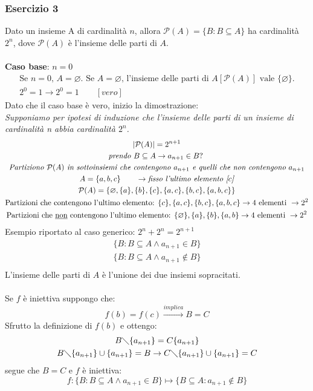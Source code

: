 \documentclass[italian]{article}
\begin{document}
\subsubsection{Esercizio 3}
Dato un insieme A di cardinalità $n$, allora $\mathcal{P}(A)=\{B:B\subseteq A\}$ ha cardinalità $2^n$, dove $\mathcal{P}(A)$ è l'insieme delle parti di $A$.\\\\
\textbf{Caso base}: $n=0$
\begin{gather*}
	\text{Se } n=0 \text{, } A=\varnothing \text{. } \text{Se } A=\varnothing \text{, l'insieme delle parti di } A [\mathcal{P}(A)]\text{ vale } \{\varnothing \}.\\
	2^0 = 1 \to 2^0 = 1 \qquad [vero]
\end{gather*}
Dato che il caso base è vero, inizio la dimostrazione:\\
\textit{Supponiamo per ipotesi di induzione che l'insieme delle parti di un insieme di cardinalità n abbia cardinalità $2^n$.}
\begin{gather*}
	|\mathcal{P}(A)|=2^{n+1} \\
	\textit{prendo } B\subseteq A \to  a_{n+1} \in B?\;\\
	\textit{Partiziono $\mathcal{P}(A)$ in sottoinsiemi che contengono } a_{n+1} \textit{ e quelli che non contengono } a_{n+1}	\\
	A = \{a,b,c\} \qquad \to \textit{fisso l'ultimo elemento [$c$]} \\
	\mathcal{P}(A)=\{\varnothing, \{a\}, \{b\}, \{c\}, \{a, c\}, \{b,c\}, \{a,b,c\}\}\\
	\text{Partizioni che contengono l'ultimo elemento: } 
	\{c\}, \{a,c\}, \{b,c\},\{a,b,c\} \to 4 \text{ elementi } \to 2^2\\
	\text{Partizioni che \underline{non} contengono l'ultimo elemento: } 
	\{\varnothing\}, \{a\}, \{b\},\{a,b\} \to 4 \text{ elementi } \to 2^2
\end{gather*}
Esempio riportato al caso generico: $2^n+2^n = 2^{n+1}$
\begin{gather*}
	\{B:B\subseteq A \land a_{n+1} \in B\} \\
	\{B:B\subseteq A \land a_{n+1} \notin B\} \\
\end{gather*}
L'insieme delle parti di $A$ è l'unione dei due insiemi sopracitati.\\\\
Se $f$ è iniettiva suppongo che:
\[
	f(b) = f(c) \xrightarrow{implica} B=C
\]
Sfrutto la definizione di $f(b)$ e ottengo:
\begin{gather*}
	B \diagdown \{a_{n+1}\} = C\{a_{n+1}\} \\
	B \diagdown \{a_{n+1}\} \cup \{a_{n+1}\} = B \to C \diagdown \{a_{n+1}\} \cup \{a_{n+1}\} = C
\end{gather*}
segue che $B=C$ e $f$ è iniettiva:
\[
	f: \{B:B\subseteq A \land a_{n+1} \in B\} \longmapsto \{B\subseteq A : a_{n+1} \notin B\}
\]\\
\pagebreak
\end{document}
